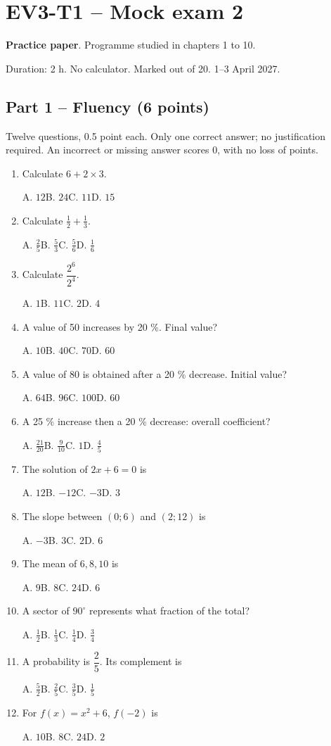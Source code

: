 \mxnewpage\section*{EV3-T1 -- Mock exam 2}\label{EV3-T1}
\textbf{Practice paper}. Programme studied in chapters 1 to 10.\par Duration: 2 h. No calculator. Marked out of 20. 1--3 April 2027.
\subsection*{Part 1 -- Fluency (6 points)}
Twelve questions, 0.5 point each. Only one correct answer; no justification required. An incorrect or missing answer scores 0, with no loss of points.
\begin{enumerate}
\item Calculate $6+2\times3$.\par A. $12$\quad B. $24$\quad C. $11$\quad D. $15$
\item Calculate $\frac12+\frac13$.\par A. $\frac{2}{5}$\quad B. $\frac{5}{3}$\quad C. $\frac{5}{6}$\quad D. $\frac{1}{6}$
\item Calculate $\dfrac{2^6}{2^{4}}$.\par A. $1$\quad B. $11$\quad C. $2$\quad D. $4$
\item A value of 50 increases by 20 \%. Final value?\par A. $10$\quad B. $40$\quad C. $70$\quad D. $60$
\item A value of 80 is obtained after a 20 \% decrease. Initial value?\par A. $64$\quad B. $96$\quad C. $100$\quad D. $60$
\item A 25 \% increase then a 20 \% decrease: overall coefficient?\par A. $\frac{21}{20}$\quad B. $\frac{9}{10}$\quad C. $1$\quad D. $\frac{4}{5}$
\item The solution of $2x+6=0$ is\par A. $12$\quad B. $-12$\quad C. $-3$\quad D. $3$
\item The slope between $(0;6)$ and $(2;12)$ is\par A. $-3$\quad B. $3$\quad C. $2$\quad D. $6$
\item The mean of $6, 8, 10$ is\par A. $9$\quad B. $8$\quad C. $24$\quad D. $6$
\item A sector of $90^\circ$ represents what fraction of the total?\par A. $\frac{1}{2}$\quad B. $\frac{1}{3}$\quad C. $\frac{1}{4}$\quad D. $\frac{3}{4}$
\item A probability is $\dfrac{2}{5}$. Its complement is\par A. $\frac{5}{2}$\quad B. $\frac{2}{5}$\quad C. $\frac{3}{5}$\quad D. $\frac{1}{5}$
\item For $f(x)=x^2+6$, $f(-2)$ is\par A. $10$\quad B. $8$\quad C. $24$\quad D. $2$
\end{enumerate}
